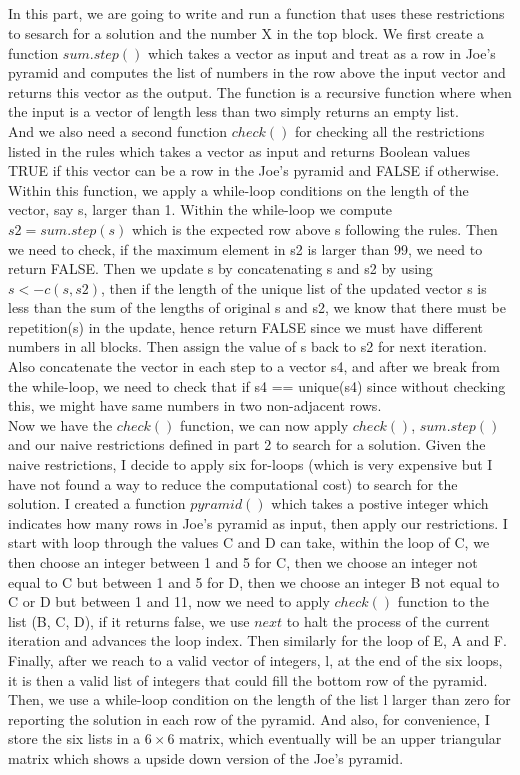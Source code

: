\documentclass[12pt]{article}\usepackage[]{graphicx}\usepackage[]{color}
\begin{document}
\subsection{}
In this part, we are going to write and run a function that uses these restrictions to sesarch for a solution and the number X in the top block. We first create a function $sum.step()$ which takes a vector as input and treat as a row in Joe's pyramid and computes the list of numbers in the row above the input vector and returns this vector as the output. The function is a recursive function where when the input is a vector of length less than two simply returns an empty list. \\
And we also need a second function $check()$ for checking all the restrictions listed in the rules which takes a vector as input and returns Boolean values TRUE if this vector can be a row in the Joe's pyramid and FALSE if otherwise. Within this function, we apply a while-loop conditions on the length of the vector, say s, larger than 1. Within the while-loop we compute $s2 = sum.step(s)$ which is the expected row above s following the rules. Then we need to check, if the maximum element in s2 is larger than 99, we need to return FALSE. Then we update s by concatenating s and s2 by using $s <- c(s, s2)$, then if the length of the unique list of the updated vector s is less than the sum of the lengths of original s and s2, we know that there must be repetition(s) in the update, hence return FALSE since we must have different numbers in all blocks. Then assign the value of s back to s2 for next iteration. Also concatenate the vector in each step to a vector s4, and after we break from the while-loop, we need to check that if s4 == unique(s4) since without checking this, we might have same numbers in two non-adjacent rows.\\
Now we have the $check()$ function, we can now apply $check()$, $sum.step()$ and our naive restrictions defined in part 2 to search for a solution. Given the naive restrictions, I decide to apply six for-loops (which is very expensive but I have not found a way to reduce the computational cost) to search for the solution. I created a function $pyramid()$ which takes a postive integer which indicates how many rows in Joe's pyramid as input, then apply our restrictions. I start with loop through the values C and D can take, within the loop of C, we then choose an integer between 1 and 5 for C, then we choose an integer not equal to C but between 1 and 5 for D, then we choose an integer B not equal to C or D but between 1 and 11, now we need to apply $check()$ function to the list (B, C, D), if it returns false, we use $next$ to halt the process of the current iteration and advances the loop index. Then similarly for the loop of E, A and F. Finally, after we reach to a valid vector of integers, l, at the end of the six loops, it is then a valid list of integers that could fill the bottom row of the pyramid. Then, we use a while-loop condition on the length of the list l larger than zero for reporting the solution in each row of the pyramid. And also, for convenience, I store the six lists in a $6\times 6$ matrix, which eventually will be an upper triangular matrix which shows a upside down version of the Joe's pyramid. \\
\end{document}
